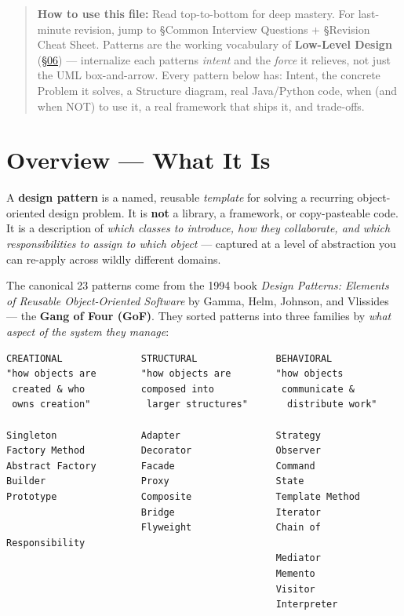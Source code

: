 \documentclass[11pt]{article}
\begin{document}
\makecoverpage

\thispagestyle{empty}
{\hypersetup{hidelinks}\tableofcontents}
\clearpage

\begin{quote}
\textbf{How to use this file:} Read top-to-bottom for deep mastery. For last-minute revision, jump to §Common Interview Questions + §Revision Cheat Sheet. Patterns are the working vocabulary of \textbf{Low-Level Design} (\hyperlink{section.06}{\textcolor{acc}{§06}}) --- internalize each pattern\textquotesingle s \emph{intent} and the \emph{force} it relieves, not just the UML box-and-arrow. Every pattern below has: Intent, the concrete Problem it solves, a Structure diagram, real Java/Python code, when (and when NOT) to use it, a real framework that ships it, and trade-offs.
\end{quote}

\section{Overview --- What It Is}\label{overview--what-it-is}

A \textbf{design pattern} is a named, reusable \emph{template} for solving a recurring object-oriented design problem. It is \textbf{not} a library, a framework, or copy-pasteable code. It is a description of \emph{which classes to introduce, how they collaborate, and which responsibilities to assign to which object} --- captured at a level of abstraction you can re-apply across wildly different domains.

The canonical 23 patterns come from the 1994 book \emph{Design Patterns: Elements of Reusable Object-Oriented Software} by Gamma, Helm, Johnson, and Vlissides --- the \textbf{Gang of Four (GoF)}. They sorted patterns into three families by \emph{what aspect of the system they manage}:

\setcodelang{}

\begin{verbatim}
CREATIONAL              STRUCTURAL              BEHAVIORAL
"how objects are        "how objects are        "how objects
 created & who          composed into            communicate &
 owns creation"          larger structures"       distribute work"

Singleton               Adapter                 Strategy
Factory Method          Decorator               Observer
Abstract Factory        Facade                  Command
Builder                 Proxy                   State
Prototype               Composite               Template Method
                        Bridge                  Iterator
                        Flyweight               Chain of Responsibility
                                                Mediator
                                                Memento
                                                Visitor
                                                Interpreter
\end{verbatim}
\end{document}
